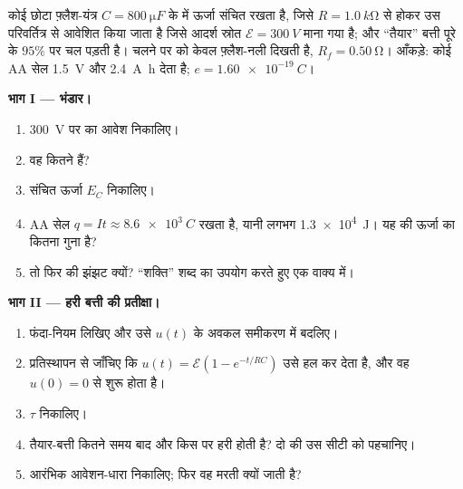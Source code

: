 \begin{problem}
\label{pb:g12:rc-rl-circuits:1}
कोई छोटा फ़्लैश-यंत्र $C = \qty{800}{\micro F}$ के  में ऊर्जा
संचित रखता है, जिसे $R = \qty{1.0}{k\ohm}$ से होकर उस परिवर्तित्र से आवेशित किया
जाता है जिसे आदर्श स्रोत $\mathcal{E} = \qty{300}{V}$ माना गया है; और ``तैयार'' बत्ती पूरे
 के $95\%$ पर चल पड़ती है। चलने पर  को
केवल फ़्लैश-नली दिखती है, $R_f = \qty{0.50}{\ohm}$। आँकड़े: कोई AA सेल \qty{1.5}{V} और \qty{2.4}{A.h} देता
है; $e = \qty{1.60e-19}{C}$।

\medskip
\noindent\textbf{भाग I --- भंडार।}
\begin{enumerate}
  \item \qty{300}{V} पर  का आवेश निकालिए।
  \item वह कितने  हैं?
  \item संचित ऊर्जा $E_C$ निकालिए।
  \item AA सेल $q = It \approx \qty{8.6e3}{C}$ रखता है, यानी लगभग \qty{1.3e4}{J}। यह  की
        ऊर्जा का कितना गुना है?
  \item तो फिर  की झंझट क्यों? ``शक्ति'' शब्द का
        उपयोग करते हुए एक वाक्य में।
\end{enumerate}

\medskip
\noindent\textbf{भाग II --- हरी बत्ती की प्रतीक्षा।}
\begin{enumerate}[resume]
  \item फंदा-नियम लिखिए और उसे $u(t)$ के अवकल समीकरण में बदलिए।
  \item प्रतिस्थापन से जाँचिए कि $u(t) = \mathcal{E}(1 - e^{-t/RC})$ उसे हल कर देता है, और वह $u(0) = 0$ से
        शुरू होता है।
  \item {} $\tau$ निकालिए।
  \item तैयार-बत्ती कितने समय बाद और किस  पर हरी होती है? दो
         की उस सीटी को पहचानिए।
  \item आरंभिक आवेशन-धारा निकालिए; फिर वह मरती क्यों जाती है?
\end{enumerate}


\end{problem}
